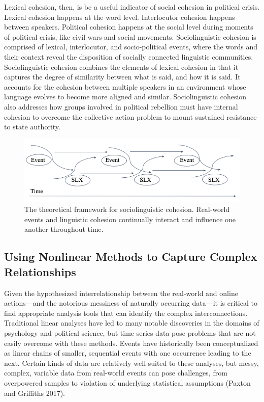 \documentclass[
  english,
  man]{apa6}
\begin{document}
Lexical cohesion, then, is be a useful indicator of social cohesion in
political crisis. Lexical cohesion happens at the word level. Interlocutor
cohesion happens between speakers. Political cohesion happens at the social
level during moments of political crisis, like civil wars and social movements.
Sociolinguistic cohesion is comprised of lexical, interlocutor, and
socio-political events, where the words and their context reveal the disposition
of socially connected linguistic communities. Sociolinguistic cohesion combines
the elements of lexical cohesion in that it captures the degree of similarity
between what is said, and how it is said. It accounts for the cohesion between
multiple speakers in an environment whose language evolves to become more
aligned and similar. Sociolinguistic cohesion also addresses how groups involved
in political rebellion must have internal cohesion to overcome the collective
action problem to mount sustained resistance to state authority.

\begin{figure}
\includegraphics[width=1\linewidth]{./figs/theoretical-framework} \caption{The theoretical framework for sociolinguistic cohesion. Real-world events and linguistic cohesion continually interact and influence one another throughout time.}\label{fig:theoretical-framework}
\end{figure}

\hypertarget{using-nonlinear-methods-to-capture-complex-relationships}{%
\subsection{Using Nonlinear Methods to Capture Complex Relationships}\label{using-nonlinear-methods-to-capture-complex-relationships}}

Given the hypothesized interrelationship between the real-world and online
actions---and the notorious messiness of naturally occurring data---it is
critical to find appropriate analysis tools that can identify the complex
interconnections. Traditional linear analyses have led to many notable
discoveries in the domains of psychology and political science, but time series
data pose problems that are not easily overcome with these methods. Events have
historically been conceptualized as linear chains of smaller, sequential events
with one occurrence leading to the next. Certain kinds of data are relatively
well-suited to these analyses, but messy, complex, variable data from real-world
events can pose challenges, from overpowered samples to violation of underlying
statistical assumptions (Paxton and Griffiths 2017).
\end{document}
